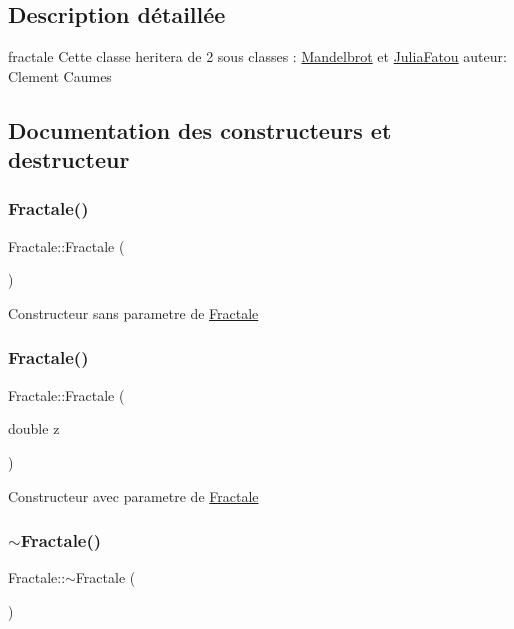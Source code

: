 \subsection{Description détaillée}
fractale Cette classe heritera de 2 sous classes \+: \hyperlink{classMandelbrot}{Mandelbrot} et \hyperlink{classJuliaFatou}{Julia\+Fatou} auteur\+: Clement Caumes 

\subsection{Documentation des constructeurs et destructeur}
\mbox{\label{classFractale_a0d3df9f1e22b8e83271406a5cf1d4f93}} 
\subsubsection{\texorpdfstring{Fractale()}{Fractale()}\hspace{0.1cm}{\footnotesize\ttfamily [1/2]}}
{\footnotesize\ttfamily Fractale\+::\+Fractale (\begin{DoxyParamCaption}{ }\end{DoxyParamCaption})}

Constructeur sans parametre de \hyperlink{classFractale}{Fractale} \mbox{\label{classFractale_a509d94d37fe5c6a8443b0eee6e516464}} 
\subsubsection{\texorpdfstring{Fractale()}{Fractale()}\hspace{0.1cm}{\footnotesize\ttfamily [2/2]}}
{\footnotesize\ttfamily Fractale\+::\+Fractale (\begin{DoxyParamCaption}\item[{double}]{z }\end{DoxyParamCaption})}

Constructeur avec parametre de \hyperlink{classFractale}{Fractale} \mbox{\label{classFractale_a36cd8c958e71902f7e20e9b2032dc089}} 
\subsubsection{\texorpdfstring{$\sim$\+Fractale()}{~Fractale()}}
{\footnotesize\ttfamily Fractale\+::$\sim$\+Fractale (\begin{DoxyParamCaption}{ }\end{DoxyParamCaption})\hspace{0.3cm}{\ttfamily [virtual]}}

